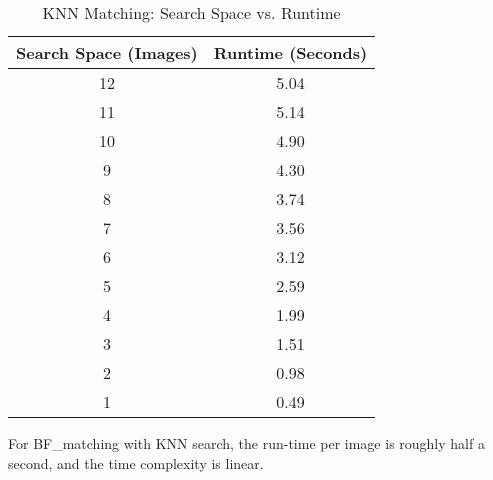 \begin{table}[H]
    \centering
    \begin{tabular}{|c|c|}
    \hline
    \textbf{Search Space (Images)} & \textbf{Runtime (Seconds)} \\ \hline
    12  & 5.04 \\ \hline
    11  & 5.14 \\ \hline
    10  & 4.90 \\ \hline
    9   & 4.30 \\ \hline
    8   & 3.74 \\ \hline
    7   & 3.56 \\ \hline
    6   & 3.12 \\ \hline
    5   & 2.59 \\ \hline
    4   & 1.99 \\ \hline
    3   & 1.51 \\ \hline
    2   & 0.98 \\ \hline
    1   & 0.49 \\ \hline
    \end{tabular}
    \caption{KNN Matching: Search Space vs. Runtime}
    \end{table}

For BF_matching with KNN search, the run-time per image is roughly half a second, and the time complexity is linear.   
